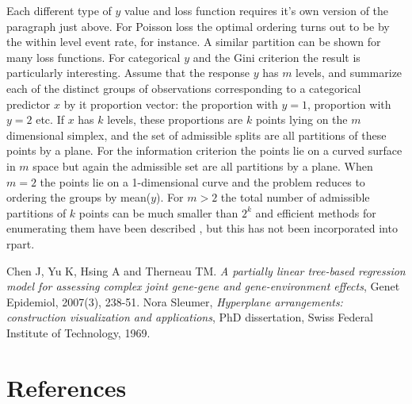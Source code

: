 Each different type of $y$ value and loss function requires it's own version
of the paragraph just above.  For Poisson loss the optimal ordering turns out
to be by the within level event rate, for instance.
A similar partition can be shown for many loss functions.
For categorical $y$ and the Gini criterion the result is particularly
interesting.
Assume that the response $y$ has $m$ levels, and summarize each of the
distinct groups of observations corresponding to a categorical predictor
$x$ by it proportion vector: the proportion with $y=1$, proportion with $y=2$
etc.  If $x$ has $k$ levels, these proportions are $k$ points lying on the
$m$ dimensional simplex,
and the set of admissible splits are all partitions of these points by a 
plane.  For the information criterion the points lie on a curved surface in
$m$ space but again the admissible set are all partitions by a plane.
When $m=2$ the points lie on a 1-dimensional curve and the problem reduces to
ordering the groups by mean($y$).
For $m>2$ the total number of admissible partitions of $k$ points can be much
smaller than $2^k$ and efficient methods for enumerating
them have been described \cite{Sleumer}, but this has not been
incorporated into rpart.  

\begin{thebibliography}{9}
 Chen J, Yu K, Hsing A and Therneau TM.
  \emph{A partially linear tree-based regression model for assessing complex
        joint gene-gene and gene-environment effects},
Genet Epidemiol, 2007(3), 238-51.
 Nora Sleumer, \emph{Hyperplane arrangements: construction
  visualization and applications}, PhD dissertation, Swiss Federal Institute
  of Technology, 1969.
\end{thebibliography}
\section*{References}

